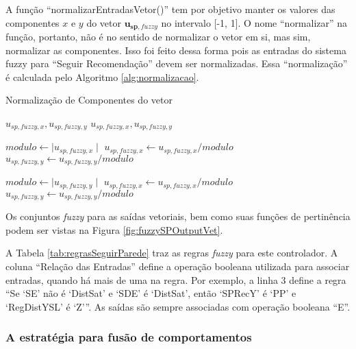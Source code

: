  	A função ``normalizarEntradasVetor()'' tem por objetivo manter os valores das componentes
 	$x$ e $y$ do vetor $\mathbf{u_{sp,\mathit{fuzzy}}}$ no intervalo [-1, 1]. O nome ``normalizar''
 	na função, portanto, não é no sentido de normalizar o vetor em si, mas sim, normalizar
 	as componentes. Isso foi feito dessa forma pois as entradas do sistema fuzzy para ``Seguir
 	Recomendação'' devem ser normalizadas. Essa ``normalização'' é calculada pelo Algoritmo
 	\ref{alg:normalizacao}.
	\begin{algorithm}[!ht]
		\caption{Normalização de Componentes do vetor}
		\label{alg:normalizacao}%
		\begin{algorithmic}[1]
	
		\REQUIRE $u_{sp,\mathit{fuzzy}, x}, u_{sp,\mathit{fuzzy}, y}$
		\ENSURE $u_{sp,\mathit{fuzzy}, x}, u_{sp,\mathit{fuzzy}, y}$
		
		\STATE $modulo \leftarrow \mid u_{sp,\mathit{fuzzy}, x} \mid$
			\STATE $u_{sp,\mathit{fuzzy}, x} \leftarrow u_{sp,\mathit{fuzzy}, x}/modulo$
			\STATE $u_{sp,\mathit{fuzzy}, y} \leftarrow u_{sp,\mathit{fuzzy}, y}/modulo$
		\ENDIF
		
		\STATE $modulo \leftarrow \mid u_{sp,\mathit{fuzzy}, y} \mid$
			\STATE $u_{sp,\mathit{fuzzy}, x} \leftarrow u_{sp,\mathit{fuzzy}, x}/modulo$
			\STATE $u_{sp,\mathit{fuzzy}, y} \leftarrow u_{sp,\mathit{fuzzy}, y}/modulo$
		\ENDIF
	
		\end{algorithmic}
	\end{algorithm}
	
	Os conjuntos \textit{fuzzy} para as saídas vetoriais, bem como suas funções de pertinência podem ser
	vistas na Figura \ref{fig:fuzzySPOutputVet}.

	
	
	A Tabela \ref{tab:regrasSeguirParede} traz as regras \textit{fuzzy} para este controlador.
	A coluna ``Relação das Entradas'' define a operação booleana utilizada para associar 
	entradas, quando há mais de uma na regra. Por exemplo, a linha 3 define a regra ``Se 
	`SE' não é `DistSat' e `SDE' é `DistSat', então `SPRecY' é `PP' e `RegDistYSL' é `Z'''.
	As saídas são sempre associadas com operação booleana ``E''.
	
	
	
	\subsubsection{A estratégia para fusão de comportamentos}
	
